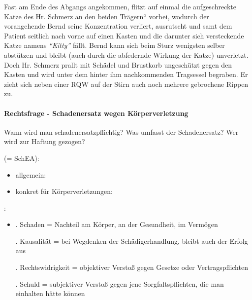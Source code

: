 Fast am Ende des Abgangs angekommen, flitzt auf einmal die
aufgeschreckte Katze des Hr. Schmerz an den beiden
{\quotedblbase}Trägern{\textquotedblleft} vorbei, wodurch der
vorangehende Bernd seine Konzentration verliert, ausrutscht und samt
dem Patient seitlich nach vorne auf einen Kasten und die
darunter sich versteckende Katze namens
\emph{"`Kitty"'} %
fällt. Bernd kann sich
beim Sturz wenigsten selber abst\"utzen und bleibt (auch durch die abfedernde Wirkung der Katze) unverletzt. Doch Hr. Schmerz prallt mit Schädel und Brustkorb
ungesch\"utzt gegen den Kasten und wird unter dem hinter ihm
nachkommenden Tragsessel begraben. Er zieht sich neben einer RQW auf
der Stirn auch noch mehrere gebrochene Rippen zu.

\paragraph{Rechtsfrage - Schadenersatz wegen K\"orperverletzung}

Wann wird man schadenersatzpflichtig? Was umfasst der Schadenersatz? Wer
wird zur Haftung gezogen?


 (= SchEA):

\begin{itemize}
    
    \item {\mdseries
    allgemein: }
    
    \item {\mdseries
    konkret f\"ur K\"orperverletzungen: }
    
\end{itemize}

:

\begin{itemize}
    
    \item[] {. Schaden = Nachteil am K\"orper, an der Gesundheit, im Verm\"ogen}
    
    {. Kausalität = bei Wegdenken der Schädigerhandlung, bleibt auch der
    Erfolg aus}
    
    {. Rechtswidrigkeit = objektiver Versto{\ss} gegen Gesetze oder
    Vertragspflichten}
    
    {. Schuld = subjektiver Versto{\ss} gegen jene Sorgfaltspflichten, die
    man einhalten hätte k\"onnen}
    
\end{itemize}

